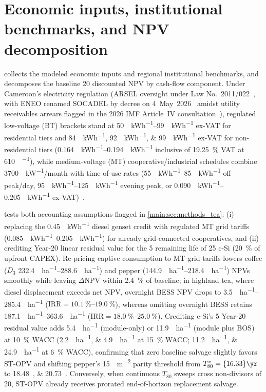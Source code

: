 \documentclass[preprint,12pt,a4paper]{elsarticle}
\begin{document}
\section{Economic inputs, institutional benchmarks, and NPV decomposition}
\label{sec:sm_econ_inputs_sec}

 collects the modeled economic inputs and regional institutional benchmarks, and  decomposes the baseline \qty{20}{\yr} discounted NPV by cash-flow component. Under Cameroon's electricity regulation (ARSEL oversight under Law No.~2011/022~\cite{CameroonLaw2011_022}, with ENEO renamed SOCADEL by decree on 4~May~2026~\cite{SOCADEL2026Decree} amidst utility receivables arrears flagged in the 2026 IMF Article~IV consultation~\cite{IMF2026Cameroon}), regulated low-voltage (BT) brackets stand at \qtyrange{50}{99}{\XAF\per\kWh} ex-VAT for residential tiers and \qtylist{84;92;99}{\XAF\per\kWh} ex-VAT for non-residential tiers (\qtyrange{0.164}{0.194}{\USD\per\kWh} inclusive of \qty{19.25}{\percent} VAT at \qty{610}{\XAF\per\USD}), while medium-voltage (MT) cooperative/industrial schedules combine \qty{3700}{\XAF\per\kW}/month with time-of-use rates (\qtyrange{55}{85}{\XAF\per\kWh} off-peak/day, \qtyrange{95}{125}{\XAF\per\kWh} evening peak, or \qtyrange{0.090}{0.205}{\USD\per\kWh} ex-VAT)~\cite{ENEO_Tariff2024}.

 tests both accounting assumptions flagged in \cref{main:sec:methods_tea}: (i) replacing the \qty{0.45}{\USD\per\kWh} diesel genset credit with regulated MT grid tariffs (\qtyrange{0.085}{0.205}{\USD\per\kWh}) for already grid-connected cooperatives, and (ii) crediting Year-20 linear residual value for the \qty{5}{\yr} remaining life of \qty{25}{\yr} c-Si (\qty{20}{\percent} of upfront CAPEX). Re-pricing captive consumption to MT grid tariffs lowers coffee ($D_3$ \qtyrange{232.4}{288.6}{\kUSD\per\hectare}) and pepper (\qtyrange{144.9}{218.4}{\kUSD\per\hectare}) NPVs smoothly while leaving $\Delta\mathrm{NPV}$ within \qty{2.4}{\percent} of baseline; in highland tea, where diesel displacement exceeds net NPV, overnight BESS NPV drops to \qtyrange{3.5}{285.4}{\kUSD\per\hectare} ($\mathrm{IRR}=\qtyrange{10.1}{19.0}{\percent}$), whereas omitting overnight BESS retains \qtyrange{187.1}{363.6}{\kUSD\per\hectare} ($\mathrm{IRR}=\qtyrange{18.0}{25.0}{\percent}$). Crediting c-Si's \qty{5}{\yr} Year-20 residual value adds \qty{5.4}{\kUSD\per\hectare} (module-only) or \qty{11.9}{\kUSD\per\hectare} (module plus BOS) at \qty{10}{\percent} WACC (\qtylist{2.2;4.9}{\kUSD\per\hectare} at \qty{15}{\percent} WACC; \qtylist{11.2;24.9}{\kUSD\per\hectare} at \qty{6}{\percent} WACC), confirming that zero baseline salvage slightly favors ST-OPV and shifting pepper's \qty{15}{\USD\per\square\meter} parity threshold from $T_{80}^*=\qty{16.33}{\yr}$ to \qtylist{18.48;20.73}{\yr}. Conversely, when continuous $T_{80}$ sweeps cross non-divisors of \qty{20}{\yr}, ST-OPV already receives prorated end-of-horizon replacement salvage.
\end{document}
